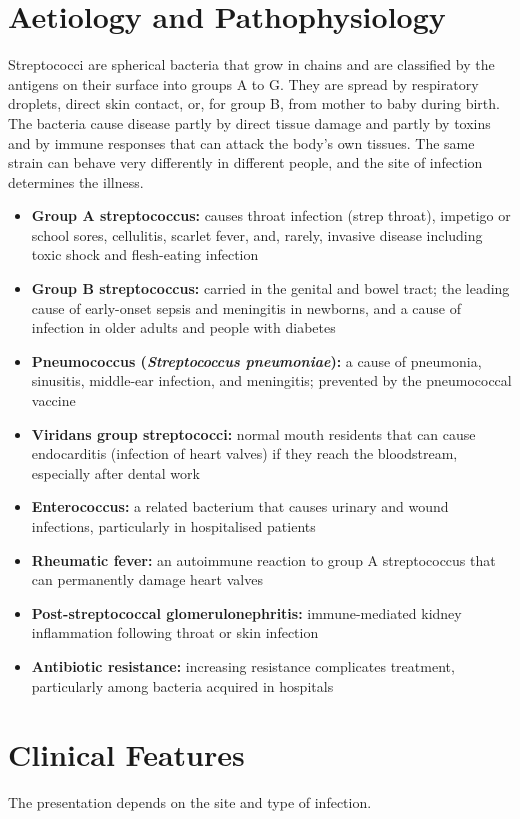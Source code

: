 \section*{Aetiology and Pathophysiology}
Streptococci are spherical bacteria that grow in chains and are classified by the antigens on their surface into groups A to G. They are spread by respiratory droplets, direct skin contact, or, for group B, from mother to baby during birth. The bacteria cause disease partly by direct tissue damage and partly by toxins and by immune responses that can attack the body's own tissues. The same strain can behave very differently in different people, and the site of infection determines the illness.

\begin{itemize}
    \item \textbf{Group A streptococcus:} causes throat infection (strep throat), impetigo or school sores, cellulitis, scarlet fever, and, rarely, invasive disease including toxic shock and flesh-eating infection
    \item \textbf{Group B streptococcus:} carried in the genital and bowel tract; the leading cause of early-onset sepsis and meningitis in newborns, and a cause of infection in older adults and people with diabetes
    \item \textbf{Pneumococcus (\textit{Streptococcus pneumoniae}):} a cause of pneumonia, sinusitis, middle-ear infection, and meningitis; prevented by the pneumococcal vaccine
    \item \textbf{Viridans group streptococci:} normal mouth residents that can cause endocarditis (infection of heart valves) if they reach the bloodstream, especially after dental work
    \item \textbf{Enterococcus:} a related bacterium that causes urinary and wound infections, particularly in hospitalised patients
    \item \textbf{Rheumatic fever:} an autoimmune reaction to group A streptococcus that can permanently damage heart valves
    \item \textbf{Post-streptococcal glomerulonephritis:} immune-mediated kidney inflammation following throat or skin infection
    \item \textbf{Antibiotic resistance:} increasing resistance complicates treatment, particularly among bacteria acquired in hospitals
\end{itemize}

\section*{Clinical Features}
The presentation depends on the site and type of infection.

